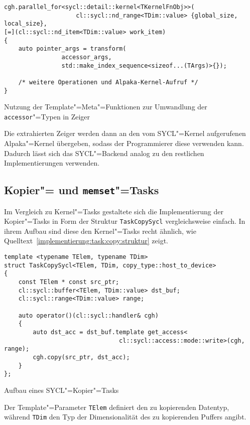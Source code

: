 \begin{code}
    \begin{verbatim}
cgh.parallel_for<sycl::detail::kernel<TKernelFnObj>>(
                    cl::sycl::nd_range<TDim::value> {global_size, local_size},
[=](cl::sycl::nd_item<TDim::value> work_item)
{
    auto pointer_args = transform(
                accessor_args,
                std::make_index_sequence<sizeof...(TArgs)>{});

    /* weitere Operationen und Alpaka-Kernel-Aufruf */
}
    \end{verbatim}
    \caption{Nutzung der Template"=Meta"=Funktionen zur Umwandlung der
             \texttt{accessor}"=Typen in Zeiger}
    \label{implementierung:task:kernel:zeiger:acctransusage}
\end{code}
Die extrahierten Zeiger werden dann an den vom SYCL"=Kernel aufgerufenen
Alpaka"=Kernel übergeben, sodass der Programmierer diese verwenden kann.
Dadurch lässt sich das SYCL"=Backend analog zu den restlichen Implementierungen
verwenden.

\subsection{Kopier"= und \texttt{memset}"=Tasks}

Im Vergleich zu Kernel"=Tasks gestaltete sich die Implementierung der
Kopier"=Tasks in Form der Struktur \texttt{TaskCopySycl} vergleichsweise
einfach. In ihrem Aufbau sind diese den Kernel"=Tasks recht ähnlich, wie
Quelltext~\ref{implementierung:task:copy:struktur} zeigt.

\begin{code}
    \begin{verbatim}
template <typename TElem, typename TDim>
struct TaskCopySycl<TElem, TDim, copy_type::host_to_device>
{
    const TElem * const src_ptr;
    cl::sycl::buffer<TElem, TDim::value> dst_buf;
    cl::sycl::range<TDim::value> range;

    auto operator()(cl::sycl::handler& cgh)
    {
        auto dst_acc = dst_buf.template get_access<
                                cl::sycl::access::mode::write>(cgh, range);
        cgh.copy(src_ptr, dst_acc);
    }
};
    \end{verbatim}
    \caption{Aufbau eines SYCL"=Kopier"=Tasks}
    \label{implementierung:task:copy:struktur}
\end{code}

Der Template"=Parameter \texttt{TElem} definiert den zu kopierenden Datentyp,
während \texttt{TDim} den Typ der Dimensionalität des zu kopierenden Puffers
angibt.  

